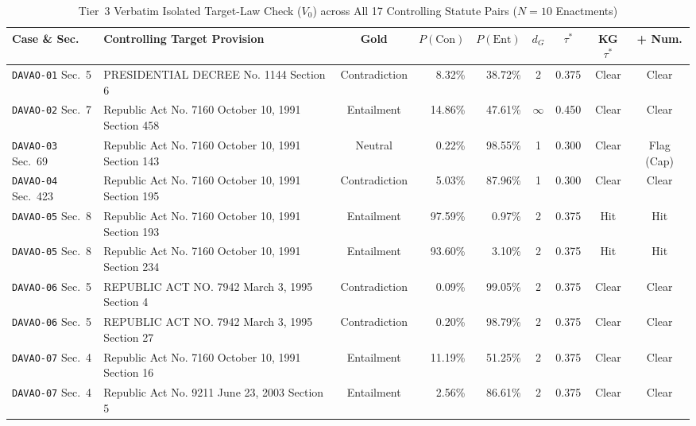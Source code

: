 \begin{landscape}
\begin{table}[p]
    \centering
    \scriptsize
    \setlength{\tabcolsep}{3.0pt}
    \renewcommand{\arraystretch}{0.88}
    \caption[Tier 3 Verbatim Isolated Target-Law Pair Breakdown ($V_0$)]{Tier~3 Verbatim Isolated Target-Law Check ($V_0$) across All 17 Controlling Statute Pairs ($N = 10$ Enactments)}
    \label{tab:app_tier3_v0_pairs}
    \begin{tabularx}{\linewidth}{@{} >{\RaggedRight\arraybackslash}p{2.9cm} >{\RaggedRight\arraybackslash}X c r r c c c c @{}}
        \toprule
        \textbf{Case \& Sec.} & \textbf{Controlling Target Provision} & \textbf{Gold} & \textbf{$P(\text{Con})$} & \textbf{$P(\text{Ent})$} & \textbf{$d_G$} & \textbf{$\tau^*$} & \textbf{KG $\tau^*$} & \textbf{+ Num.} \\
        \midrule
        \texttt{DAVAO-01} Sec.~5 & PRESIDENTIAL DECREE No. 1144 Section 6 & Contradiction & 8.32\% & 38.72\% & 2 & 0.375 & Clear & Clear \\
        \texttt{DAVAO-02} Sec.~7 & Republic Act No. 7160 October 10, 1991 Section 458 & Entailment & 14.86\% & 47.61\% & $\infty$ & 0.450 & Clear & Clear \\
        \texttt{DAVAO-03} Sec.~69 & Republic Act No. 7160 October 10, 1991 Section 143 & Neutral & 0.22\% & 98.55\% & 1 & 0.300 & Clear & Flag (Cap) \\
        \texttt{DAVAO-04} Sec.~423 & Republic Act No. 7160 October 10, 1991 Section 195 & Contradiction & 5.03\% & 87.96\% & 1 & 0.300 & Clear & Clear \\
        \texttt{DAVAO-05} Sec.~8 & Republic Act No. 7160 October 10, 1991 Section 193 & Entailment & 97.59\% & 0.97\% & 2 & 0.375 & Hit & Hit \\
        \texttt{DAVAO-05} Sec.~8 & Republic Act No. 7160 October 10, 1991 Section 234 & Entailment & 93.60\% & 3.10\% & 2 & 0.375 & Hit & Hit \\
        \texttt{DAVAO-06} Sec.~5 & REPUBLIC ACT NO. 7942 March 3, 1995 Section 4 & Contradiction & 0.09\% & 99.05\% & 2 & 0.375 & Clear & Clear \\
        \texttt{DAVAO-06} Sec.~5 & REPUBLIC ACT NO. 7942 March 3, 1995 Section 27 & Contradiction & 0.20\% & 98.79\% & 2 & 0.375 & Clear & Clear \\
        \texttt{DAVAO-07} Sec.~4 & Republic Act No. 7160 October 10, 1991 Section 16 & Entailment & 11.19\% & 51.25\% & 2 & 0.375 & Clear & Clear \\
        \texttt{DAVAO-07} Sec.~4 & Republic Act No. 9211 June 23, 2003 Section 5 & Entailment & 2.56\% & 86.61\% & 2 & 0.375 & Clear & Clear \\

\end{tabularx}
\end{table}
\end{landscape}
